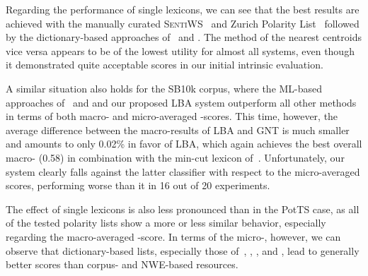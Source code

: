 Regarding the performance of single lexicons, we can see that the best
results are achieved with the manually curated
\textsc{SentiWS}~\cite{Remus:10} and Zurich Polarity
List~\cite{Clematide:10} followed by the dictionary-based approaches
of~\citet{Blair-Goldensohn:08} and \citet{Rao:09}.  The method of the
nearest centroids vice versa appears to be of the lowest utility for
almost all systems, even though it demonstrated quite acceptable
scores in our initial intrinsic evaluation.

A similar situation also holds for the SB10k corpus, where the
ML-based approaches of~\citet{Mohammad:13} and \citet{Guenther:14} and
our proposed LBA system outperform all other methods in terms of both
macro- and micro-averaged \F{}-scores.  This time, however, the
average difference between the macro-results of LBA and GNT is much
smaller and amounts to only 0.02\% in favor of LBA, which again
achieves the best overall macro-\F{} (0.58) in combination with the
min-cut lexicon of~\citet{Rao:09}.  Unfortunately, our system clearly
falls against the latter classifier with respect to the micro-averaged
scores, performing worse than it in 16 out of 20 experiments.

The effect of single lexicons is also less pronounced than in the
PotTS case, as all of the tested polarity lists show a more or less
similar behavior, especially regarding the macro-averaged \F{}-score.
In terms of the micro-\F{}, however, we can observe that
dictionary-based lists, especially those of~\citet{Awadallah:10},
\citet{Blair-Goldensohn:08}, \citet{Hu:04}, and \citet{Kim:04}, lead
to generally better scores than corpus- and NWE-based resources.


